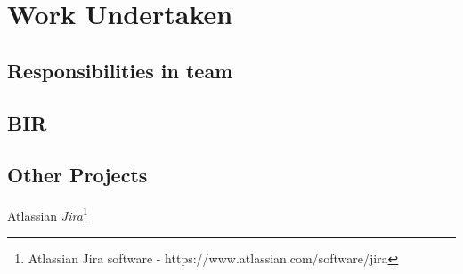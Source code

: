 \chapter{Work Undertaken}

\section{Responsibilities in team}

\section{BIR}

\section{Other Projects}

\begin{comment}
lorem ipsum blah blah blah
\end{comment}

Atlassian \textit{Jira}\footnote{Atlassian Jira software - https://www.atlassian.com/software/jira}
